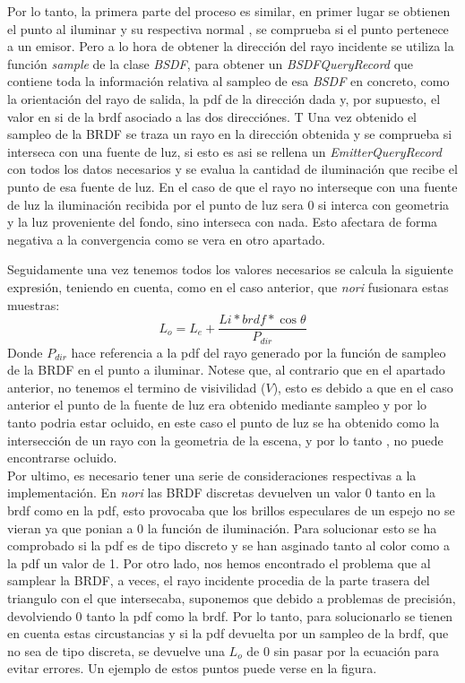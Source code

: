 \documentclass[10pt,oneside,a4paper]{article}
\begin{document}
Por lo tanto, la primera parte del proceso es similar, en primer lugar se obtienen el punto al iluminar y su respectiva normal , se comprueba si el punto pertenece a un emisor. Pero a lo hora de obtener la dirección del rayo incidente se utiliza la función \textit{sample} de la clase \textit{BSDF}, para obtener un \textit{BSDFQueryRecord} que contiene toda la información relativa al sampleo de esa \textit{BSDF} en concreto, como la orientación del rayo de salida, la pdf de la dirección dada y, por supuesto, el valor en si de la brdf asociado a las dos direcciónes.
T
Una vez obtenido el sampleo de la BRDF se traza un rayo en la dirección obtenida y se comprueba si interseca con una fuente de luz, si esto es asi se rellena un \textit{EmitterQueryRecord} con todos los datos necesarios y se evalua la cantidad de iluminación que recibe el punto de esa fuente de luz. En el caso de que el rayo no interseque con una fuente de luz la iluminación recibida por el punto de luz sera 0 si interca con geometria y la luz proveniente del fondo, sino interseca con nada. Esto afectara de forma negativa a la convergencia como se vera en otro apartado.

Seguidamente una vez tenemos todos los valores necesarios se calcula la siguiente expresión, teniendo en cuenta, como en el caso anterior, que \textit{nori} fusionara estas muestras:
$$L_o = L_e + \frac{Li * brdf *\cos\theta}{P_{dir}}$$
Donde $P_{dir}$ hace referencia a la pdf del rayo generado por la función de sampleo de la BRDF en el punto a iluminar. Notese que, al contrario que en el apartado anterior, no tenemos el termino de visivilidad ($V$), esto es debido a que en el caso anterior el punto de la fuente de luz era obtenido mediante sampleo y por lo tanto podria estar ocluido, en este caso el punto de luz se ha obtenido como la intersección de un rayo con la geometria de la escena, y por lo tanto , no puede encontrarse ocluido.\\

Por ultimo, es necesario tener una serie de consideraciones respectivas a la implementación. En \textit{nori} las BRDF discretas devuelven un valor 0 tanto en la brdf como en la pdf, esto provocaba que los brillos especulares de un espejo no se vieran ya que ponian a 0 la función de iluminación. Para solucionar esto se ha comprobado si la pdf es de tipo discreto y se han asginado tanto al color como a la pdf un valor de 1. Por otro lado, nos hemos encontrado el problema que al samplear la BRDF, a veces, el rayo incidente procedia de la parte trasera del triangulo con el que intersecaba, suponemos que debido a problemas de precisión, devolviendo 0 tanto la pdf como la brdf. Por lo tanto, para solucionarlo se tienen en cuenta estas circustancias y si la pdf devuelta por un sampleo de la brdf, que no sea de tipo discreta, se devuelve una $L_o$ de 0 sin pasar por la ecuación para evitar errores. Un ejemplo de estos puntos puede verse en la figura.
\end{document}
